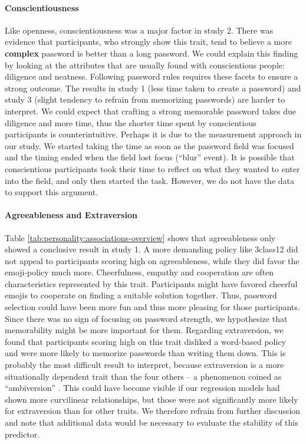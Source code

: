 \paragraph{Conscientiousness} Like openness, conscientiousness was a major factor in study 2. There was evidence that participants, who strongly show this trait, tend to believe a more \textbf{complex} password is better than a long password. We could explain this finding by looking at the attributes that are usually found with conscientious people: diligence and neatness. Following password rules requires these facets to ensure a strong outcome. The results in study 1 (less time taken to create a password) and study 3 (slight tendency to refrain from memorizing passwords) are harder to interpret. We could expect that crafting a strong memorable password takes due diligence and more time, thus the shorter time spent by conscientious participants is counterintuitive. Perhaps it is due to the measurement approach in our study. We started taking the time as soon as the password field was focused and the timing ended when the field lost focus (``blur'' event). It is possible that conscientious participants took their time to reflect on what they wanted to enter into the field, and only then started the task. However, we do not have the data to support this argument.


\paragraph{Agreeableness and Extraversion} Table \ref{tab:personality:associations-overview} shows that agreeableness only showed a conclusive result in study 1. A more demanding policy like 3class12 did not appeal to participants scoring high on agreeableness, while they did favor the emoji-policy much more. Cheerfulness, empathy and cooperation are often characteristics represented by this trait. 
Participants might have favored cheerful emojis to cooperate on finding a suitable solution together. Thus, password selection could have been more fun and thus more pleasing for those participants. Since there was no sign of focusing on password strength, we hypothesize that memorability might be more important for them. 
Regarding extraversion, we found that participants scoring high on this trait disliked a word-based policy and were more likely to memorize passwords than writing them down. This is probably the most difficult result to interpret, because extraversion is a more situationally dependent trait than the four others -- a phenomenon coined as ``ambiversion'' \cite{Grant2013Ambivert}. This could have become visible if our regression models had shown more curvilinear relationships, but those were not significantly more likely for extraversion than for other traits. We therefore refrain from further discussion and note that additional data would be necessary to evaluate the stability of this predictor. 

